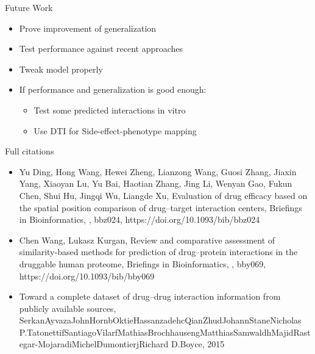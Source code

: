 \documentclass[10pt]{beamer}
\begin{document}
\begin{frame}{Future Work}
	\begin{itemize}
		\item Prove improvement of generalization
		\item Test performance against recent approaches
		\item Tweak model properly
		\item If performance and generalization is good enough:
		\begin{itemize}
			\item Test some predicted interactions in vitro
			\item Use DTI for Side-effect-phenotype mapping
		\end{itemize}
	\end{itemize}
\end{frame}


\begin{frame}{Full citations}
	\footnotesize
	\begin{itemize}
		\item Yu Ding, Hong Wang, Hewei Zheng, Lianzong Wang, Guosi Zhang, Jiaxin Yang, Xiaoyan Lu, Yu Bai, Haotian Zhang, Jing Li, Wenyan Gao, Fukun Chen, Shui Hu, Jingqi Wu, Liangde Xu, Evaluation of drug efficacy based on the spatial position comparison of drug–target interaction centers, Briefings in Bioinformatics, , bbz024, https://doi.org/10.1093/bib/bbz024
		\item Chen Wang, Lukasz Kurgan, Review and comparative assessment of similarity-based methods for prediction of drug–protein interactions in the druggable human proteome, Briefings in Bioinformatics, , bby069, https://doi.org/10.1093/bib/bby069
		\item Toward a complete dataset of drug–drug interaction information from publicly available sources, SerkanAyvazaJohnHornbOktieHassanzadehcQianZhudJohannStaneNicholas P.TatonettifSantiagoVilarfMathiasBrochhausengMatthiasSamwaldhMajidRastegar-MojaradiMichelDumontierjRichard D.Boyce, 2015
		
	\end{itemize}
\end{frame}
\end{document}
